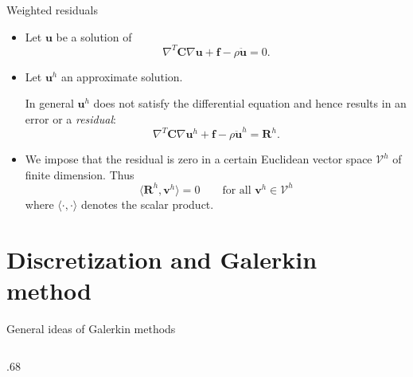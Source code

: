 \documentclass[aspectratio=169]{beamer}
\begin{document}
{\begin{frame}{Weighted residuals}
  \begin{itemize}
    \item  Let $\mathbf u$ be a solution of
          $$\nabla^T\mathbf C\nabla \mathbf u+\mathbf f-\rho\mathbf{\ddot{u}}=0.$$
    \item Let $\mathbf u^{h}$ an approximate solution.
          \begin{block}{}
            In general $\mathbf u^{h}$ does not satisfy the diﬀerential equation and hence results in an error or a \emph{residual}:
            $$\nabla^T\mathbf C\nabla \mathbf u^{h}+\mathbf f-\rho\mathbf{\ddot{u}}^{h}=\mathbf R^{h}.$$
          \end{block}
    \item We impose that the residual is zero in a certain Euclidean vector space $\mathcal V^h$ of finite dimension. Thus
          $$\langle\mathbf R^{h}, \mathbf v^h\rangle=0\qquad \text{for all }\mathbf v^h\in\mathcal V^{h}$$
          where $\langle\cdot,\cdot\rangle$ denotes the scalar product.
  \end{itemize}
\end{frame}


\section{Discretization and Galerkin method}

\begin{frame}{General ideas of Galerkin methods}
  \begin{columns}[T]
    \begin{column}{.68\textwidth}\vspace{1.2cm}
      \vspace{-1cm}
      \begin{center}
      \end{center}


\end{column}
\end{columns}
\end{frame}}
\end{document}
